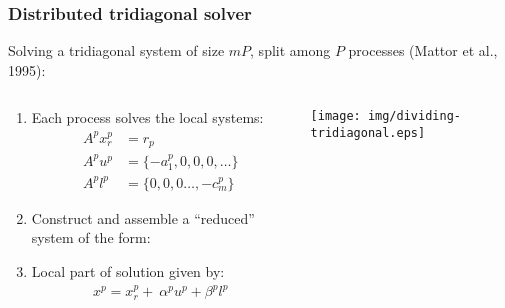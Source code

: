 \begin{frame}
\frametitle{Distributed tridiagonal solver}

Solving a tridiagonal system of size
$mP$, split among $P$ processes (Mattor et al., 1995):

\footnotesize
\begin{columns}
\begin{column}{0.5\textwidth}
\begin{enumerate}
\item Each process solves the local systems:
    \begin{align*}
        A^px_r^{p} &= r_p \\
        A^pu^p &= \{-a_1^p, 0, 0, 0, \hdots\} \\
        A^pl^p &= \{0, 0, 0 \hdots, -c_m^p\}
    \end{align*}
\item Construct and assemble a ``reduced'' system
    of the form:
\item Local part of solution given by:
\begin{align*}
x^p = x_r^p + \
    \alpha^p u^p + \beta^p l^p
\end{align*}
\end{enumerate}
\end{column}
\begin{column}{0.5\textwidth}
\centering
\texttt{[image: img/dividing-tridiagonal.eps]}
\end{column}
\end{columns}
\end{frame}

